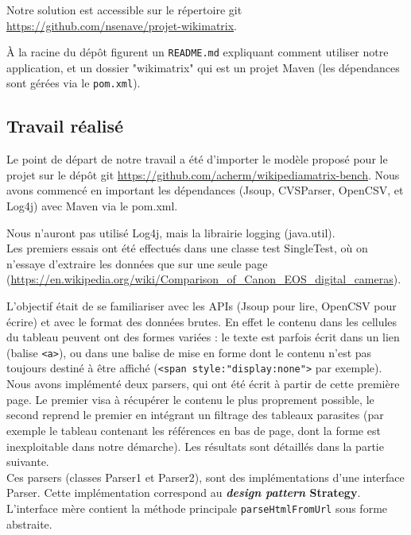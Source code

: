 \documentclass[french]{article}
\begin{document}
Notre solution est accessible sur le répertoire git \url{https://github.com/nsenave/projet-wikimatrix}.

À la racine du dépôt figurent un \texttt{README.md} expliquant comment utiliser notre application, et un dossier "wikimatrix" qui est un projet Maven (les dépendances sont gérées via le \texttt{pom.xml}).

\subsection{Travail réalisé}

Le point de départ de notre travail a été d'importer le modèle proposé pour le projet sur le dépôt git \url{https://github.com/acherm/wikipediamatrix-bench}. Nous avons commencé en important les dépendances (Jsoup, CVSParser, OpenCSV, et Log4j) avec Maven via le pom.xml.

Nous n'auront pas utilisé Log4j, mais la librairie logging (java.util).\\

Les premiers essais ont été effectués dans une classe test SingleTest, où on n'essaye d'extraire les données que sur une seule page (\url{https://en.wikipedia.org/wiki/Comparison_of_Canon_EOS_digital_cameras}).

L'objectif était de se familiariser avec les APIs (Jsoup pour lire, OpenCSV pour écrire) et avec le format des données brutes. En effet le contenu dans les cellules du tableau peuvent ont des formes variées : le texte est parfois écrit dans un lien (balise \texttt{<a>}), ou dans une balise de mise en forme dont le contenu n'est pas toujours destiné à être affiché (\texttt{<span style:"display:none">} par exemple). \\

Nous avons implémenté deux parsers, qui ont été écrit à partir de cette première page. Le premier visa à récupérer le contenu le plus proprement possible, le second reprend le premier en intégrant un filtrage des tableaux parasites (par exemple le tableau contenant les références en bas de page, dont la forme est inexploitable dans notre démarche). Les résultats sont détaillés dans la partie suivante. \\

Ces parsers (classes Parser1 et Parser2), sont des implémentations d'une interface Parser. Cette implémentation correspond au \textbf{\textit{design pattern} Strategy}. L'interface mère contient la méthode principale \texttt{parseHtmlFromUrl} sous forme abstraite.
\end{document}
